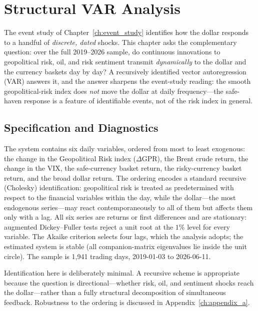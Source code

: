 %

\chapter{Structural VAR Analysis}
\label{ch:svar}

The event study of Chapter~\ref{ch:event_study} identifies how the dollar responds to a
handful of \emph{discrete, dated} shocks. This chapter asks the complementary question:
over the full 2019--2026 sample, do continuous innovations to geopolitical risk, oil, and
risk sentiment transmit \emph{dynamically} to the dollar and the currency baskets day by
day? A recursively identified vector autoregression (VAR) answers it, and the answer
sharpens the event-study reading: the smooth geopolitical-risk index does \emph{not}
move the dollar at daily frequency---the safe-haven response is a feature of identifiable
events, not of the risk index in general.


\section{Specification and Diagnostics}
\label{sec:svar_diagnostics}

The system contains six daily variables, ordered from most to least exogenous: the change
in the Geopolitical Risk index ($\Delta\text{GPR}$), the Brent crude return, the change in
the VIX, the safe-currency basket return, the risky-currency basket return, and the broad
dollar return. The ordering encodes a standard recursive (Cholesky) identification:
geopolitical risk is treated as predetermined with respect to the financial variables
within the day, while the dollar---the most endogenous series---may react
contemporaneously to all of them but affects them only with a lag. All six series are
returns or first differences and are stationary: augmented Dickey--Fuller tests reject a
unit root at the $1\%$ level for every variable. The Akaike criterion selects four lags,
which the analysis adopts; the estimated system is stable (all companion-matrix
eigenvalues lie inside the unit circle). The sample is 1{,}941 trading days,
2019-01-03 to 2026-06-11.

Identification here is deliberately minimal. A recursive scheme is appropriate because the
question is directional---whether risk, oil, and sentiment shocks reach the dollar---rather
than a fully structural decomposition of simultaneous feedback. Robustness to the ordering
is discussed in Appendix~\ref{ch:appendix_a}.


